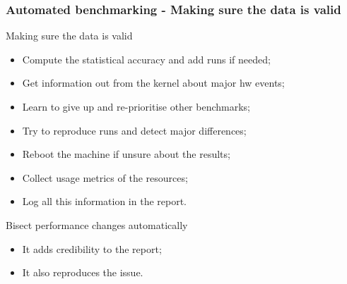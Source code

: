 \documentclass[11pt,english,compress]{beamer}
\begin{document}
\begin{frame}
	\frametitle{Automated benchmarking - Making sure the data is valid}

	\begin{block}{Making sure the data is valid}
		\begin{itemize}
			\item Compute the statistical accuracy and add runs if needed;\pause
			\item Get information out from the kernel about major hw events;\pause
			\item Learn to give up and re-prioritise other benchmarks;\pause
			\item Try to reproduce runs and detect major differences;\pause
			\item Reboot the machine if unsure about the results;\pause
			\item Collect usage metrics of the resources;\pause
			\item Log all this information in the report.
		\end{itemize}
	\end{block}
	
	\pause
	
	\begin{block}{Bisect performance changes automatically}
		\begin{itemize}
			\item It adds credibility to the report;\pause
			\item It also reproduces the issue.
		\end{itemize}
	\end{block}
\end{frame}
\end{document}
